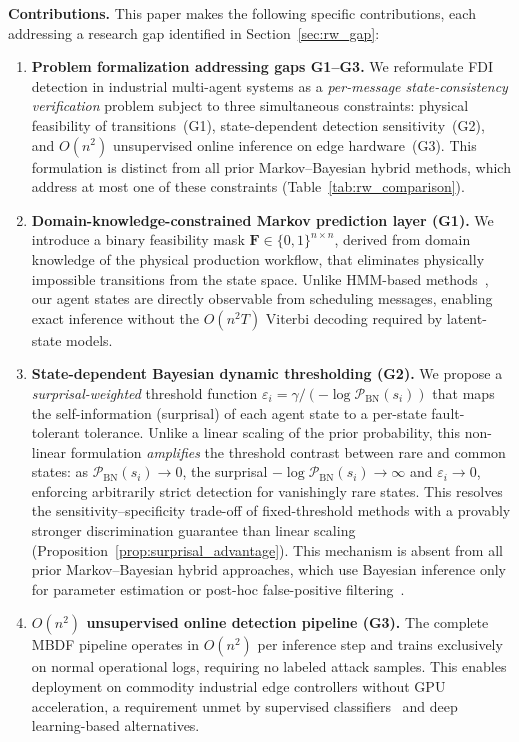\documentclass[manuscript,screen,review]{acmart}
\begin{document}
\textbf{Contributions.} This paper makes the following
specific contributions, each addressing a research gap
identified in Section~\ref{sec:rw_gap}:
\begin{enumerate}

\item \textbf{Problem formalization addressing gaps G1--G3.}
We reformulate FDI detection in industrial multi-agent
systems as a \emph{per-message state-consistency
verification} problem subject to three simultaneous
constraints: physical feasibility of transitions~(G1),
state-dependent detection sensitivity~(G2), and $O(n^2)$
unsupervised online inference on edge hardware~(G3). This
formulation is distinct from all prior Markov--Bayesian
hybrid methods, which address at most one of these
constraints (Table~\ref{tab:rw_comparison}).

\item \textbf{Domain-knowledge-constrained Markov prediction
layer (G1).}
We introduce a binary feasibility mask
$\mathbf{F} \in \{0,1\}^{n \times n}$, derived from
domain knowledge of the physical production workflow, that
eliminates physically impossible transitions from the state
space. Unlike HMM-based methods~\cite{ref_ourston}, our
agent states are directly observable from scheduling
messages, enabling exact inference without the $O(n^2 T)$
Viterbi decoding required by latent-state models.

\item \textbf{State-dependent Bayesian dynamic thresholding
(G2).}
We propose a \emph{surprisal-weighted} threshold function
\(\varepsilon_i = \gamma / {(-\log \mathcal{P}_{\mathrm{BN}}(s_i))}\)
that maps the self-information (surprisal) of each agent
state to a per-state fault-tolerant tolerance.
Unlike a linear scaling of the prior probability, this
non-linear formulation \emph{amplifies} the threshold
contrast between rare and common states: as
\(\mathcal{P}_{\mathrm{BN}}(s_i) \to 0\),
the surprisal \(-\log \mathcal{P}_{\mathrm{BN}}(s_i) \to \infty\)
and \(\varepsilon_i \to 0\), enforcing arbitrarily strict
detection for vanishingly rare states.
This resolves the sensitivity--specificity trade-off of
fixed-threshold methods with a provably stronger
discrimination guarantee than linear scaling
(Proposition~\ref{prop:surprisal_advantage}).
This mechanism is absent from all prior Markov--Bayesian
hybrid approaches, which use Bayesian inference only for
parameter estimation or post-hoc false-positive
filtering~\cite{ref21,ref22}.

\item \textbf{$O(n^2)$ unsupervised online detection pipeline
(G3).}
The complete MBDF pipeline operates in $O(n^2)$ per
inference step and trains exclusively on normal operational
logs, requiring no labeled attack samples. This enables
deployment on commodity industrial edge controllers without
GPU acceleration, a requirement unmet by supervised
classifiers~\cite{ref9,ref10,ref11} and deep learning-based
alternatives.

\end{enumerate}
\end{document}
